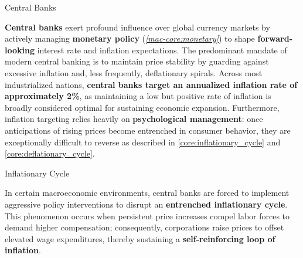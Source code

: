 \documentclass[10pt]{article}
\begin{document}
  \begin{core}{Central Banks}

    \textbf{Central banks} exert profound influence over global currency markets by actively managing \textbf{monetary policy} (\textit{\autoref{mac-core:monetary}}) to shape \textbf{forward-looking} interest rate and inflation expectations. The predominant mandate of modern central banking is to maintain price stability by guarding against excessive inflation and, less frequently, deflationary spirals. Across most industrialized nations, \textbf{central banks target an annualized inflation rate of approximately 2\%}, as maintaining a low but positive rate of inflation is broadly considered optimal for sustaining economic expansion. Furthermore, inflation targeting relies heavily on \textbf{psychological management}: once anticipations of rising prices become entrenched in consumer behavior, they are exceptionally difficult to reverse as described in \autoref{core:inflationary_cycle} and \autoref{core:deflationary_cycle}.


  \end{core}

  \begin{core}[label=core:inflationary_cycle]{Inflationary Cycle}

    In certain macroeconomic environments, central banks are forced to implement aggressive policy interventions to disrupt an \textbf{entrenched inflationary cycle}. This phenomenon occurs when persistent price increases compel labor forces to demand higher compensation; consequently, corporations raise prices to offset elevated wage expenditures, thereby sustaining a \textbf{self-reinforcing loop of inflation}.


  \end{core}
\end{document}
